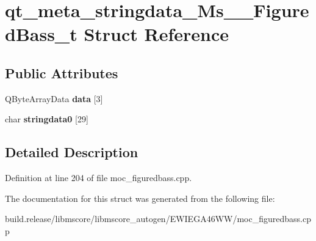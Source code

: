 \hypertarget{structqt__meta__stringdata___ms_____figured_bass__t}{}\section{qt\+\_\+meta\+\_\+stringdata\+\_\+\+Ms\+\_\+\+\_\+\+Figured\+Bass\+\_\+t Struct Reference}
\label{structqt__meta__stringdata___ms_____figured_bass__t}
\subsection*{Public Attributes}
\begin{DoxyCompactItemize}
\item 
\mbox{\label{structqt__meta__stringdata___ms_____figured_bass__t_a3fd57f271165e62b85c0e99004b0f2f8}} 
Q\+Byte\+Array\+Data {\bfseries data} \mbox{[}3\mbox{]}
\item 
\mbox{\label{structqt__meta__stringdata___ms_____figured_bass__t_af43eb962761c5103dbbe9aad7a11a6f0}} 
char {\bfseries stringdata0} \mbox{[}29\mbox{]}
\end{DoxyCompactItemize}


\subsection{Detailed Description}


Definition at line 204 of file moc\+\_\+figuredbass.\+cpp.



The documentation for this struct was generated from the following file\+:\begin{DoxyCompactItemize}
\item 
build.\+release/libmscore/libmscore\+\_\+autogen/\+E\+W\+I\+E\+G\+A46\+W\+W/moc\+\_\+figuredbass.\+cpp\end{DoxyCompactItemize}
